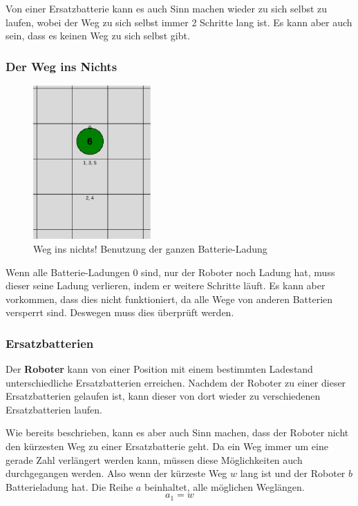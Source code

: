 \documentclass[a4paper,12pt,arial]{scrartcl}
\begin{document}
Von einer Ersatzbatterie kann es auch Sinn machen wieder zu sich selbst zu laufen, wobei der Weg zu sich selbst immer 2 Schritte lang ist. Es kann aber auch sein, dass es keinen Weg zu sich selbst gibt.

\newpage

\subsubsection{Der Weg ins Nichts}
\captionsetup[figure]{name=Abb.}
\begin{figure}[h]
    \centering
    \includegraphics[width=0.4\textwidth]{way_ins_nothing.pdf}
    \caption{Weg ins nichts! Benutzung der ganzen Batterie-Ladung}
    \label{fig:way_to_nothing}
\end{figure}
\captionsetup[figure]{name=Abbildung}

Wenn alle Batterie-Ladungen 0 sind, nur der Roboter noch Ladung hat, muss dieser seine Ladung verlieren, indem er weitere Schritte läuft. Es kann aber vorkommen, dass dies nicht funktioniert, da alle Wege von anderen Batterien versperrt sind. Deswegen muss dies überprüft werden.

\subsubsection{Ersatzbatterien}

Der \textbf{Roboter} kann von einer Position mit einem bestimmten Ladestand unterschiedliche Ersatzbatterien erreichen. Nachdem der Roboter zu einer dieser Ersatzbatterien gelaufen ist, kann dieser von dort wieder zu verschiedenen Ersatzbatterien laufen.
\par
Wie bereits beschrieben, kann es aber auch Sinn machen, dass der Roboter nicht den kürzesten Weg zu einer Ersatzbatterie geht. Da ein Weg immer um eine gerade Zahl verlängert werden kann, müssen diese Möglichkeiten auch durchgegangen werden.
Also wenn der kürzeste Weg $w$ lang ist und der Roboter $b$ Batterieladung hat. Die Reihe $a$ beinhaltet, alle möglichen Weglängen.
\\
\[  a_1 = w \]
\end{document}
